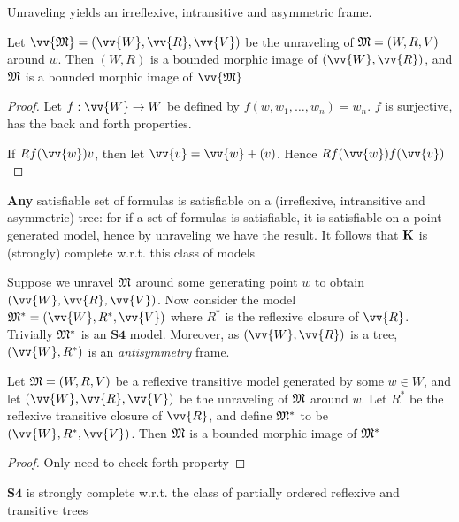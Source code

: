 \documentclass[11pt]{article}
\begin{document}
Unraveling yields an irreflexive, intransitive and asymmetric frame.

\begin{lemma}[]
Let \(\vv{\fM}=(\vv{W},\vv{R},\vv{V})\) be the unraveling of \(\mathfrak{M}=(W,R,V)\)
around \(w\). Then \((W,R)\) is a bounded morphic image of
\((\vv{W},\vv{R})\), and \(\mathfrak{M}\) is a bounded morphic image of \(\vv{\fM}\)
\end{lemma}

\begin{proof}
Let \(f:\vv{W}\to W\) be defined by \(f(w,w_1,\dots,w_n)=w_n\). \(f\) is
surjective, has the back and forth properties.

If \(Rf(\vv{w})v\), then let \(\vv{v}=\vv{w}+(v)\). Hence \(Rf(\vv{w})f(\vv{v})\)
\end{proof}

\textbf{Any} satisfiable set of formulas is satisfiable on a (irreflexive,
intransitive and asymmetric) tree: for if a set of formulas is satisfiable,
it is satisfiable on a point-generated model, hence by unraveling we have the
result. It follows that \(\operatorname{\textbf{K}}\) is (strongly) complete w.r.t. this class of models

Suppose we unravel \(\mathfrak{M}\) around some generating point \(w\) to obtain
\((\vv{W},\vv{R},\vv{V})\). Now consider the model
\(\fM^*=(\vv{W},R^*,\vv{V})\) where \(R^*\) is the reflexive closure of
\(\vv{R}\). Trivially \(\mathfrak{M}^*\) is an \(\textbf{S4}\) model. Moreover, as
\((\vv{W},\vv{R})\) is a tree, \((\vv{W},R^*)\) is an \emph{antisymmetry} frame.

\begin{lemma}[]
\label{lemma4.53}
Let \(\mathfrak{M}=(W,R,V)\) be a reflexive transitive model generated by some
\(w\in W\), and let \((\vv{W},\vv{R},\vv{V})\) be the unraveling of \(\mathfrak{M}\)
around \(w\). Let \(R^*\) be the reflexive transitive closure of \(\vv{R}\),
and define \(\mathfrak{M}^*\) to be \((\vv{W},R^*,\vv{V})\). Then \(\mathfrak{M}\) is a bounded
morphic image of \(\mathfrak{M}^*\)
\end{lemma}

\begin{proof}
Only need to check forth property
\end{proof}

\begin{theorem}[]
\(\textbf{S4}\) is strongly complete w.r.t. the class of partially ordered
reflexive and transitive trees
\end{theorem}
\end{document}
